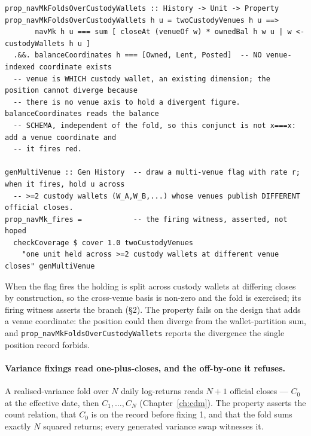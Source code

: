 \documentclass[11pt,a4paper]{article}
\begin{document}
\begin{lstlisting}
prop_navMkFoldsOverCustodyWallets :: History -> Unit -> Property
prop_navMkFoldsOverCustodyWallets h u = twoCustodyVenues h u ==>
       navMk h u === sum [ closeAt (venueOf w) * ownedBal h w u | w <- custodyWallets h u ]
  .&&. balanceCoordinates h === [Owned, Lent, Posted]  -- NO venue-indexed coordinate exists
  -- venue is WHICH custody wallet, an existing dimension; the position cannot diverge because
  -- there is no venue axis to hold a divergent figure. balanceCoordinates reads the balance
  -- SCHEMA, independent of the fold, so this conjunct is not x===x: add a venue coordinate and
  -- it fires red.

genMultiVenue :: Gen History  -- draw a multi-venue flag with rate r; when it fires, hold u across
  -- >=2 custody wallets (W_A,W_B,...) whose venues publish DIFFERENT official closes.
prop_navMk_fires =            -- the firing witness, asserted, not hoped
  checkCoverage $ cover 1.0 twoCustodyVenues
    "one unit held across >=2 custody wallets at different venue closes" genMultiVenue
\end{lstlisting}

When the flag fires the holding is split across custody wallets at differing closes by construction,
so the cross-venue basis is non-zero and the fold is exercised; its firing witness asserts the
branch (\S 2). The property fails on the
design that adds a venue coordinate: the position could then diverge from the wallet-partition sum,
and \texttt{prop\_navMkFoldsOverCustodyWallets} reports the divergence the single position record
forbids.

\paragraph{Variance fixings read one-plus-closes, and the off-by-one it refuses.}
A realised-variance fold over $N$ daily log-returns reads $N+1$ official closes ---
$C_0$ at the effective date, then $C_1,\dots,C_{N}$ (Chapter~\ref{ch:cdm}). The property
asserts the count relation, that $C_0$ is on the record before fixing 1, and that the fold
sums exactly $N$ squared returns; every generated variance swap witnesses it.
\end{document}
